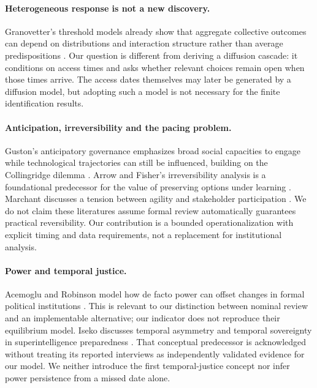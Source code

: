 \documentclass[11pt,a4paper]{article}
\theoremstyle{definition}\newtheorem{definition}{Definition}
\begin{document}
\paragraph{Heterogeneous response is not a new discovery.}
Granovetter's threshold models already show that aggregate collective outcomes can depend on distributions and interaction structure rather than average predispositions \cite{granovetter}. Our question is different from deriving a diffusion cascade: it conditions on access times and asks whether relevant choices remain open when those times arrive. The access dates themselves may later be generated by a diffusion model, but adopting such a model is not necessary for the finite identification results.

\paragraph{Anticipation, irreversibility and the pacing problem.}
Guston's anticipatory governance emphasizes broad social capacities to engage while technological trajectories can still be influenced, building on the Collingridge dilemma \cite{guston}. Arrow and Fisher's irreversibility analysis is a foundational predecessor for the value of preserving options under learning \cite{arrow}. Marchant discusses a tension between agility and stakeholder participation \cite{marchant}. We do not claim these literatures assume formal review automatically guarantees practical reversibility. Our contribution is a bounded operationalization with explicit timing and data requirements, not a replacement for institutional analysis.

\paragraph{Power and temporal justice.}
Acemoglu and Robinson model how de facto power can offset changes in formal political institutions \cite{acemoglu}. This is relevant to our distinction between nominal review and an implementable alternative; our indicator does not reproduce their equilibrium model. Iseko discusses temporal asymmetry and temporal sovereignty in superintelligence preparedness \cite{iseko}. That conceptual predecessor is acknowledged without treating its reported interviews as independently validated evidence for our model. We neither introduce the first temporal-justice concept nor infer power persistence from a missed date alone.
\end{document}

